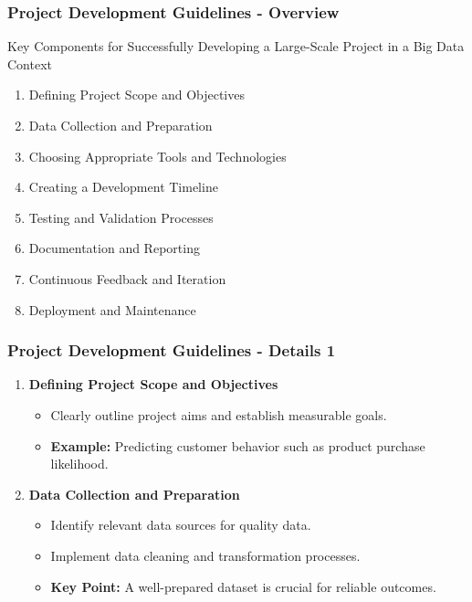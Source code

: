 \documentclass[aspectratio=169]{beamer}
\begin{document}
\begin{frame}[fragile]
    \frametitle{Project Development Guidelines - Overview}
    \begin{block}{Key Components for Successfully Developing a Large-Scale Project in a Big Data Context}
        \begin{enumerate}
            \item Defining Project Scope and Objectives
            \item Data Collection and Preparation
            \item Choosing Appropriate Tools and Technologies
            \item Creating a Development Timeline
            \item Testing and Validation Processes
            \item Documentation and Reporting
            \item Continuous Feedback and Iteration
            \item Deployment and Maintenance
        \end{enumerate}
    \end{block}
\end{frame}

\begin{frame}[fragile]
    \frametitle{Project Development Guidelines - Details 1}
    \begin{enumerate}
        \item \textbf{Defining Project Scope and Objectives}
            \begin{itemize}
                \item Clearly outline project aims and establish measurable goals.
                \item \textbf{Example:} Predicting customer behavior such as product purchase likelihood.
            \end{itemize}

        \item \textbf{Data Collection and Preparation}
            \begin{itemize}
                \item Identify relevant data sources for quality data.
                \item Implement data cleaning and transformation processes.
                \item \textbf{Key Point:} A well-prepared dataset is crucial for reliable outcomes.
            \end{itemize}
    \end{enumerate}
\end{frame}
\end{document}
